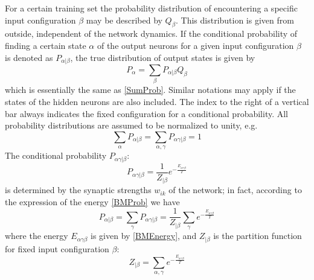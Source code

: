 For a certain training set the probability distribution of encountering a specific input configuration $\beta$ may be described by $Q_\beta$. This distribution is given from outside, independent of the network dynamics. If the conditional probability of finding a certain state $\alpha$ of the output neurons for a given input configuration $\beta$ is denoted as $P_{\alpha|\beta}$, the true distribution of output states is given by
\begin{equation}\label{sumofcondprob}
P_\alpha=\sum_\beta P_{\alpha|\beta}Q_\beta
\end{equation}
which is essentially the same as \eqref{SumProb}. Similar notations may apply if the states of the hidden neurons are also
included. The index to the right of a vertical bar always indicates the fixed configuration for a conditional probability. All probability distributions are assumed to be normalized to unity, e.g.
\begin{equation}\label{BMnormalization}
\sum_\alpha P_{\alpha|\beta}=\sum_{\alpha,\gamma}P_{\alpha\gamma|\beta}=1
\end{equation}
The conditional probability $P_{\alpha\gamma|\beta}$:
\begin{equation}
P_{\alpha\gamma|\beta}=\frac{1}{Z_{|\beta}}e^{-\frac{E_{\alpha\gamma\beta}}{T}}
\end{equation}
is determined by the synaptic strengths $w_{ik}$ of the network; in fact, according to the expression of the energy \eqref{BMProb} we have
\begin{equation}
P_{\alpha|\beta}=\sum_\gamma P_{\alpha\gamma|\beta}=\frac{1}{Z_{|\beta}}\sum_\gamma e^{-\frac{E_{\alpha\gamma\beta}}{T}}
\end{equation}
where the energy $E_{\alpha\gamma\beta}$ is given by \eqref{BMEnergy}, and $Z_{|\beta}$ is the partition function for fixed input configuration $\beta$:
\begin{equation}
Z_{|\beta}=\sum_{\alpha,\gamma}e^{-\frac{E_{\alpha\gamma\beta}}{T}}
\end{equation}

